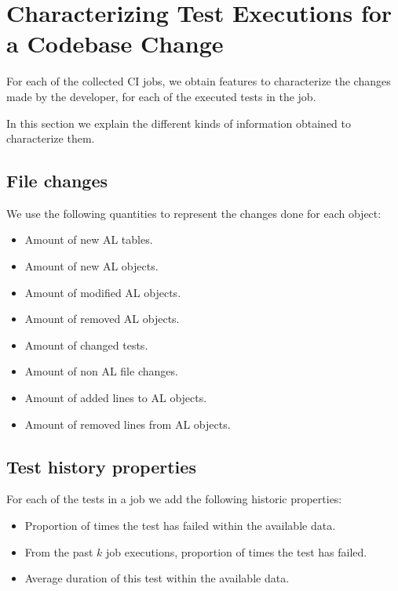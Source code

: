 \section{Characterizing Test Executions for a Codebase Change}\label{s:method-characterizing-testruns}

For each of the collected CI jobs, we obtain features to characterize
the changes made by the developer, for each of the executed tests in the job.

In this section we explain the different kinds of information obtained to
characterize them.

\subsection{File changes}

We use the following quantities to represent the changes done for each object:

\begin{itemize}
    \item Amount of new AL tables.
    \item Amount of new AL objects.
    \item Amount of modified AL objects.
    \item Amount of removed AL objects.
    \item Amount of changed tests.
    \item Amount of non AL file changes.
    \item Amount of added lines to AL objects.
    \item Amount of removed lines from AL objects.
\end{itemize}

\subsection{Test history properties}

For each of the tests in a job we add the following historic properties:

\begin{itemize}
    \item Proportion of times the test has failed within the available data.
    \item From the past $k$ job executions, proportion of times the test has failed.
    \item Average duration of this test within the available data.
\end{itemize}

